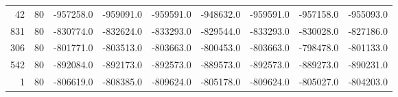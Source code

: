 \begin{table*}
\begin{tabular}{rrrrrrrrr}
    42       &     80 &-957258.0 &-959091.0& -959591.0& -948632.0& -959591.0& -957158.0 &-955093.0\\
    831      &      80& -830774.0& -832624.0& -833293.0& -829544.0& -833293.0 &-830028.0& -827186.0\\
    306      &      80& -801771.0& -803513.0& -803663.0& -800453.0& -803663.0& -798478.0& -801133.0\\
    542      &      80& -892084.0& -892173.0& -892573.0& -889573.0& -892573.0& -889273.0& -890231.0\\
    1        &    80& -806619.0 &-808385.0& -809624.0& -805178.0 &-809624.0& -805027.0 &-804203.0\\

    \bottomrule
    \end{tabular}
\end{table*}
